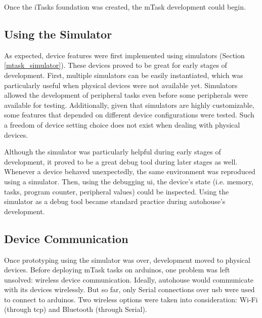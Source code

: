 Once the \gls{iTasks} foundation was created, the \gls{mTask} development could begin.

\subsection{Using the Simulator}
As expected, device features were first implemented using simulators (Section \ref{mtask_simulator}). These devices proved to be great for early stages of development. First, multiple simulators can be easily instantiated, which was particularly useful when physical devices were not available yet. Simulators allowed the development of peripheral tasks even before some peripherals were available for testing. Additionally, given that simulators are highly customizable, some features that depended on different device configurations were tested. Such a freedom of device setting choice does not exist when dealing with physical devices. 

Although the simulator was particularly helpful during early stages of development, it proved to be a great debug tool during later stages as well. Whenever a device behaved unexpectedly, the same environment was reproduced using a simulator. Then, using the debugging \acs{ui}, the device's state (i.e. memory, tasks, program counter, peripheral values) could be inspected. Using the simulator as a debug tool became standard practice during \gls{autohouse}'s development.

\subsection{Device Communication}
Once prototyping using the simulator was over, development moved to physical devices. Before deploying \gls{mTask} tasks on \gls{arduino}s, one problem was left unsolved: wireless device communication. Ideally, \gls{autohouse} would communicate with its devices wirelessly. But so far, only Serial connections over \acs{usb} were used to connect to \gls{arduino}s. Two wireless options were taken into consideration: Wi-Fi (through \acs{tcp}) and Bluetooth (through Serial).

